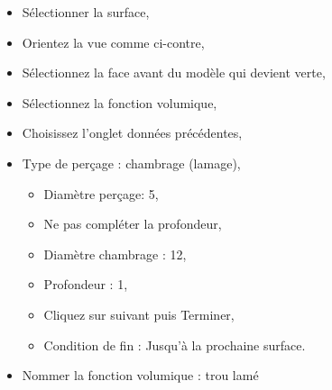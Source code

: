 \begin{minipage}{0.75\linewidth}
\begin{itemize}
 \item Sélectionner la surface,
 \item Orientez la vue comme ci-contre,
 \item Sélectionnez la face avant du modèle qui devient verte,
 \item Sélectionnez la fonction volumique,
 \item Choisissez l'onglet données précédentes,
 \item Type de perçage : chambrage (lamage),
 \begin{itemize}
  \item Diamètre perçage: 5,
  \item Ne pas compléter la profondeur,
  \item Diamètre chambrage : 12,
  \item Profondeur : 1,
  \item Cliquez sur suivant puis Terminer,
  \item Condition de fin : Jusqu'à la prochaine surface.
 \end{itemize}
 \item Nommer la fonction volumique : trou lamé
\end{itemize}
\end{minipage}
\hfill
